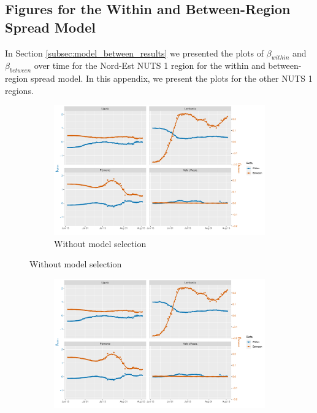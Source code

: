 \documentclass[12pt]{article}
\begin{document}
\begin{appendices}
		\subsection{Figures for the Within and Between-Region Spread Model} \label{sapp:model_between_figures}
		In Section \ref{subsec:model_between_results} we presented the plots of $\beta_{within}$ and $\beta_{between}$ over time for the Nord-Est NUTS 1 region for the within and between-region spread model. In this appendix, we present the plots for the other NUTS 1 regions.
		
		\begin{figure}[H]
    	    \centering
    	    \begin{subfigure}{\textwidth}
    	      \centering
    	      \includegraphics[width=\linewidth]{output/model_between_lag14_betas_Nord-Ovest_rolling.pdf}
    	      \caption{Without model selection}
    	      \label{fig:beta_between_over_time_nordovest_regular}
    	    \end{subfigure}
        \end{figure}
        \begin{figure}[H]\ContinuedFloat
    	    \begin{subfigure}{\textwidth}
    	      \centering
    	      \includegraphics[width=\linewidth]{output/model_between_lag14_betas_Nord-Ovest_aic_rolling.pdf}

\end{subfigure}
\end{figure}
\end{appendices}
\end{document}
